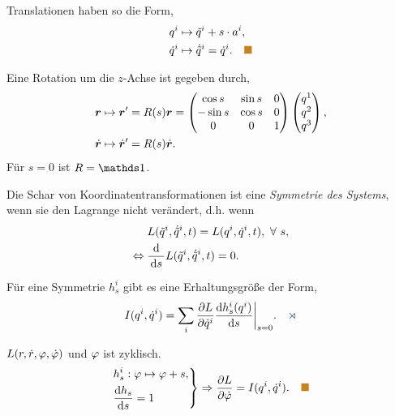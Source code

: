 \begin{bsp}
Translationen haben so die Form,
\begin{align*}
&q^i \mapsto \tilde{q}^i + s\cdot a^i,\\
&\dot{q}^i \mapsto \dot{\tilde{q}}^i  = \dot{q}^i.\bsphere
\end{align*}
\end{bsp}
\begin{bsp}
Eine Rotation um die $z$-Achse ist gegeben durch,
\begin{align*}
&\bm{r} \mapsto \bm{r}' = R(s)\bm{r} =
\begin{pmatrix}
\cos s & \sin s & 0\\
-\sin s & \cos s & 0\\
0 & 0 & 1
\end{pmatrix}
\begin{pmatrix}
q^1 \\ q^2 \\ q^3 
\end{pmatrix},\\
&\dot{\bm{r}}\mapsto \dot{\bm{r}}' = R(s)\dot{\bm{r}}.
\end{align*}
Für $s=0$ ist $R=\Id$.\bsphere
\end{bsp}

Die Schar von Koordinatentransformationen ist eine \emph{Symmetrie des Systems},
wenn sie den Lagrange nicht verändert, d.h. wenn
\begin{align*}
&L(\tilde{q}^i,\dot{\tilde{q}}^i,t) = L(q^i,\dot{q}^i,t), \forall s,\\
\Leftrightarrow\; & \frac{\diffd}{\ds}L(\tilde{q}^i,\dot{\tilde{q}}^i,t) = 0.
\end{align*}

\begin{propn}
Für eine Symmetrie $h_s^i$ gibt es eine Erhaltungsgröße der Form,
\begin{align*}
I(q^i,\dot{q}^i) = \sum_i \frac{\partial L}{\partial \dot{q}^i}
\frac{\diffd h_s^i(q^i)}{\ds} \bigg|_{s=0}.\fishhere
\end{align*}
\end{propn}

\begin{bsp}
$L(r,\dot{r},\varphi,\dot{\varphi})$ und $\varphi$ ist zyklisch.
\begin{align*}
\left.
\begin{aligned}
&h_s^i: \ph\mapsto \ph+s,\\
&\frac{\diffd h_s}{\diffd s} = 1
\end{aligned}
\right\}\Rightarrow \frac{\partial L}{\partial \dot{\ph}} =
I(q^i,\dot{q}^i).\bsphere
\end{align*}
\end{bsp}

